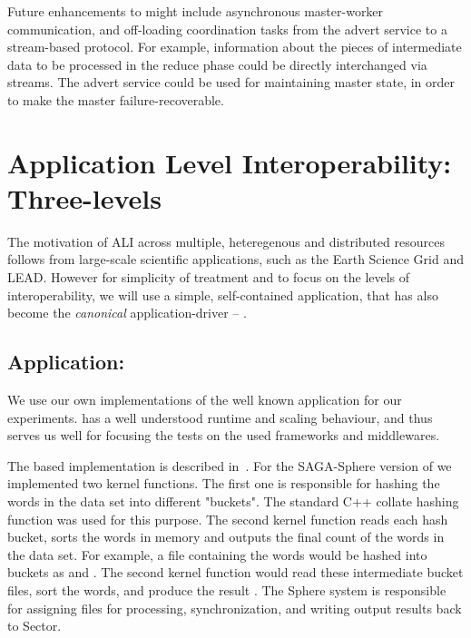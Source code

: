 \documentclass[3p,twocolumn]{elsarticle}
\begin{document}
Future enhancements to \sagamapreduce might include asynchronous master-worker
communication, and off-loading coordination tasks from the advert service to
a stream-based protocol.  For example, information about the pieces of
intermediate data to be processed in the reduce phase could be directly
interchanged via streams.  The advert service could be used for maintaining
master state, in order to make the master failure-recoverable.


\section{Application Level Interoperability: Three-levels}
\label{sec:interop}

The motivation of ALI across multiple, heteregenous and distributed
resources follows from large-scale scientific applications, such as
the Earth Science Grid and LEAD. However for simplicity of treatment
and to focus on the levels of interoperability, we will use a simple,
self-contained application, that has also become the {\it canonical}
\mr application-driver -- \wc.

\subsection{Application: \Wc}
\label{ssec:app}

We use our own implementations of the well known \wc application for
our experiments.  \Wc has a well understood runtime and scaling
behaviour, and thus serves us well for focusing the tests on the used
frameworks and middlewares.

The \mr based \wc implementation is described in~\cite{saga_ccgrid09}.
For the SAGA-Sphere version of \wc we implemented two kernel
functions. The first one is responsible for hashing the
words in the data set into different "buckets". The standard C++ 
collate hashing function was used for this purpose.  The second 
kernel function reads each hash bucket, sorts the words in memory 
and outputs the final count of the words in the data set.  For example, 
a file containing the words
 would be hashed into buckets as
 and .  The second kernel
function would read these intermediate bucket files, sort the words,
and produce the result .  The Sphere system is responsible for assigning files for
processing, synchronization, and writing output results back to
Sector.
\end{document}
